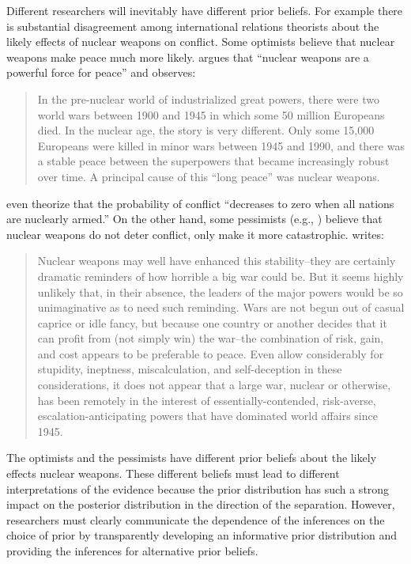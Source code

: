 \documentclass[12pt]{article}
\begin{document}
Different researchers will inevitably have different prior beliefs. 
For example there is substantial disagreement among international relations theorists about the likely effects of nuclear weapons on conflict. 
Some optimists believe that nuclear weapons make peace much more likely. 
\citet[p. 57]{Mearsheimer1993} argues that ``nuclear weapons are a powerful force for peace'' and observes:
\begin{quote}
In the pre-nuclear world of industrialized great powers, there were two world wars between 1900 and 1945 in which some 50 million Europeans died. In the nuclear age, the story is very different. Only some 15,000 Europeans were killed in minor wars between 1945 and 1990, and there was a stable peace between the superpowers that became increasingly robust over time. A principal cause of this ``long peace'' was nuclear weapons.
\end{quote}
\citet[p. 283]{BDMRiker1982} even theorize that the probability of conflict ``decreases to zero when all nations are nuclearly armed.'' 
On the other hand, some pessimists (e.g., \citealt{Sagan1994}) believe that nuclear weapons do not deter conflict, only make it more catastrophic. 
\citet[pp. 68-69]{Mueller1988} writes: 
\begin{quote}
Nuclear weapons may well have enhanced this stability--they are certainly dramatic reminders of how horrible a big war could be. But it seems highly unlikely that, in their absence, the leaders of the major powers would be so unimaginative as to need such reminding. Wars are not begun out of casual caprice or idle fancy, but because one country or another decides that it can profit from (not simply win) the war--the combination of risk, gain, and cost appears to be preferable to peace. Even allow considerably for stupidity, ineptness, miscalculation, and self-deception in these considerations, it does not appear that a large war, nuclear or otherwise, has been remotely in the interest of essentially-contended, risk-averse, escalation-anticipating powers that have dominated world affairs since 1945.
\end{quote}

The optimists and the pessimists have different prior beliefs about the likely effects nuclear weapons. 
These different beliefs must lead to different interpretations of the evidence because the prior distribution has such a strong impact on the posterior distribution in the direction of the separation. 
However, researchers must clearly communicate the dependence of the inferences on the choice of prior by transparently developing an informative prior distribution and providing the inferences for alternative prior beliefs.
\end{document}

